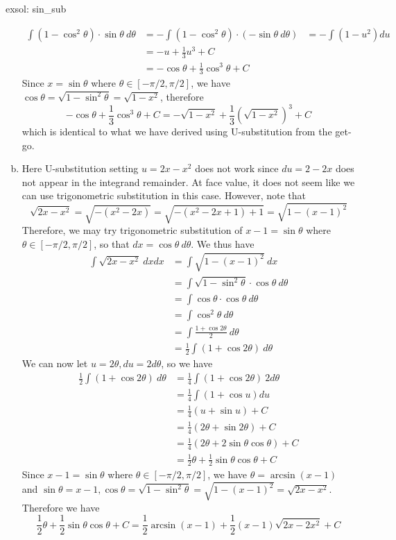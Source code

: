 \begin{exsol}[]{exsol: sin_sub}
\begin{enumerate}[a)]
\begin{align*}
            \int (1-\cos^2\theta)\cdot \sin \theta~d\theta &= -\int (1-\cos^2\theta)\cdot (-\sin \theta~d\theta)
            &= -\int (1-u^2)du\\
            &= -u+\frac{1}{3}u^3 + C\\
            &= -\cos \theta + \frac{1}{3} \cos^3\theta + C
        \end{align*}
        Since $x = \sin \theta$ where $\theta \in [-\pi/2, \pi/2]$, we have $\cos \theta = \sqrt{1-\sin^2\theta} = \sqrt{1-x^2}$, therefore
        \[-\cos \theta + \frac{1}{3} \cos^3\theta + C = - \sqrt{1-x^2} + \frac{1}{3}(\sqrt{1-x^2})^3 + C\]
        which is identical to what we have derived using U-substitution from the get-go.
        \item Here U-substitution setting $u = 2x-x^2$ does not work since $du = 2-2x$ does not appear in the integrand remainder.  At face value, it does not seem like we can use trigonometric substitution in this case.  However, note that
        \[\sqrt{2x-x^2} = \sqrt{-(x^2-2x)} = \sqrt{-(x^2-2x+1) + 1} = \sqrt{1-(x-1)^2}\]
        Therefore, we may try trigonometric substitution of $x-1 = \sin \theta$ where $\theta \in [-\pi/2, \pi/2]$, so that $dx = \cos \theta~d\theta$.  We thus have
        \begin{align*}
            \int \sqrt{2x-x^2}~dxdx &= \int \sqrt{1-(x-1)^2}~dx\\
            &= \int \sqrt{1-\sin^2\theta}\cdot\cos\theta~d\theta\\
            &= \int \cos \theta \cdot \cos \theta ~ d\theta\\
            &= \int \cos^2 \theta~d\theta\\
            &= \int \frac{1+\cos 2\theta}{2}~d\theta\\
            &= \frac{1}{2}\int (1+\cos 2\theta)~d\theta
        \end{align*}
        We can now let $u = 2\theta, du = 2d\theta$, so we have
        \begin{align*}
            \frac{1}{2}\int (1+\cos 2\theta)~d\theta &= \frac{1}{4}\int (1+\cos 2\theta)~2d\theta\\
            &= \frac{1}{4}\int (1+\cos u)du\\
            &= \frac{1}{4}(u + \sin u) + C\\
            &= \frac{1}{4}(2\theta + \sin 2\theta) + C\\
            &= \frac{1}{4}(2\theta + 2\sin\theta\cos\theta) + C\\
            &= \frac{1}{2}\theta + \frac{1}{2}\sin\theta\cos\theta + C
        \end{align*}
        Since $x-1 = \sin \theta$ where $\theta \in [-\pi/2, \pi/2]$, we have $\theta = \arcsin (x-1)$ and $\sin\theta = x-1, \cos \theta = \sqrt{1-\sin^2 \theta} = \sqrt{1-(x-1)^2} = \sqrt{2x-x^2}$.  Therefore we have
        \[\frac{1}{2}\theta + \frac{1}{2}\sin\theta\cos\theta + C = \frac{1}{2}\arcsin (x-1) + \frac{1}{2}(x-1)\sqrt{2x-2x^2} + C\]
    \end{enumerate}
\end{exsol}
